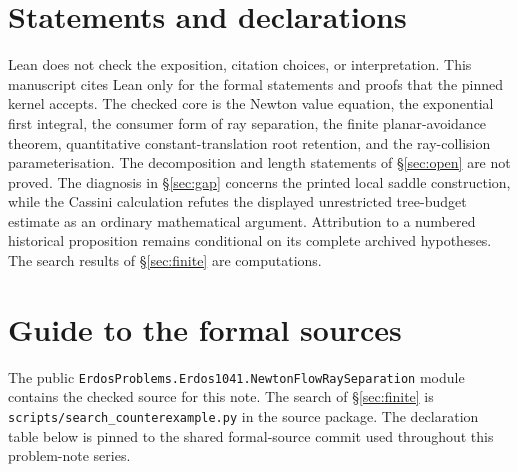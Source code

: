 \documentclass[11pt]{article}
\begin{document}
\section*{Statements and declarations}

Lean does not check the exposition, citation choices, or interpretation. This
manuscript cites Lean only for the formal statements and proofs that the pinned
kernel accepts. The checked
core is the Newton value equation, the exponential first integral, the consumer
form of ray separation, the finite planar-avoidance theorem, quantitative
constant-translation root retention, and the ray-collision parameterisation.  The
decomposition and length statements of \S\ref{sec:open} are not proved.  The
diagnosis in \S\ref{sec:gap} concerns the printed local saddle construction,
while the Cassini calculation refutes the displayed unrestricted tree-budget
estimate as an ordinary mathematical argument.  Attribution to a numbered
historical proposition remains conditional on its complete archived
hypotheses.  The
search results of \S\ref{sec:finite} are computations.

\appendix
\section{Guide to the formal sources}\label{app:sources}

The public \texttt{ErdosProblems.Erdos1041.NewtonFlowRaySeparation} module
contains the checked source for this note.  The search of \S\ref{sec:finite} is
\texttt{scripts/search\_counterexample.py} in the source package.  The
declaration table below is pinned to the shared formal-source commit used
throughout this problem-note series.
\end{document}
